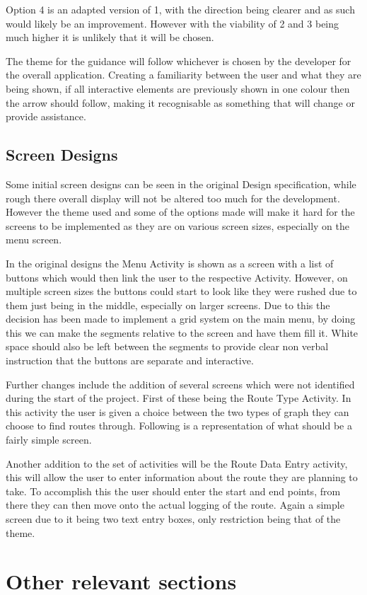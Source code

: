 Option 4 is an adapted version of 1, with the direction being clearer and as such would likely be an improvement. However with the viability of 2 and 3 being much higher it is unlikely that it will be chosen.

The theme for the guidance will follow whichever is chosen by the developer for the overall application. Creating a familiarity between the user and what they are being shown, if all interactive elements are previously shown in one colour then the arrow should follow, making it recognisable as something that will change or provide assistance. 
\subsection{Screen Designs}
Some initial screen designs can be seen in the original Design specification, while rough there overall display will not be altered too much for the development. However the theme used and some of the options made will make it hard for the screens to be implemented as they are on various screen sizes, especially on the menu screen.

In the original designs the Menu Activity is shown as a screen with a list of buttons which would then link the user to the respective Activity. However, on multiple screen sizes the buttons could start to look like they were rushed due to them just being in the middle, especially on larger screens. Due to this the decision has been made to implement a grid system on the main menu, by doing this we can make the segments relative to the screen and have them fill it. White space should also be left between the segments to provide clear non verbal instruction that the buttons are separate and interactive. 

Further changes include the addition of several screens which were not identified during the start of the project. First of these being the Route Type Activity. In this activity the user is given a choice between the two types of graph they can choose to find routes through. Following is a representation of what should be a fairly simple screen.

Another addition to the set of activities will be the Route Data Entry activity, this will allow the user to enter information about the route they are planning to take. To accomplish this the user should enter the start and end points, from there they can then move onto the actual logging of the route. Again a simple screen due to it being two text entry boxes, only restriction being that of the theme.
\newpage
\section{Other relevant sections}